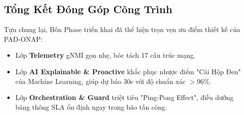 \documentclass[12pt,a4paper]{article}
\begin{document}
\subsection{Tổng Kết Đóng Góp Công Trình}

Tựu chung lại, Bốn Phase triển khai đã thể hiện trọn vẹn ưu điểm thiết kế của PAD-ONAP:
\begin{itemize}
    \item Lớp \textbf{Telemetry} gNMI gọn nhẹ, bóc tách 17 cấu trúc mạng.
    \item Lớp \textbf{AI Explainable \& Proactive} khắc phục nhược điểm "Cái Hộp Đen" của Machine Learning, giúp dự báo 30s với độ chuẩn xác $>96\%$.
    \item Lớp \textbf{Orchestration \& Guard} triệt tiêu "Ping-Pong Effect", điều dưỡng băng thông SLA ổn định ngay trong bão tấn công.
\end{itemize}

\end{document}
